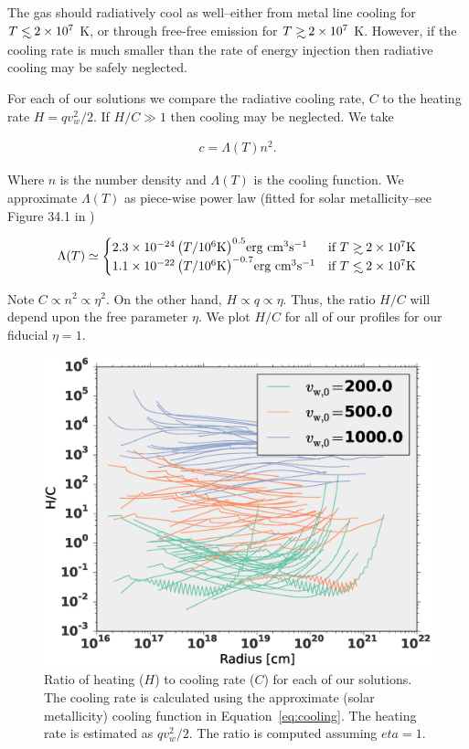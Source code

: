 \documentclass[usenatbib,fleqn]{mn2e}
\newcommand\lsim{\mathrel{\rlap{\lower4pt\hbox{\hskip1pt$\sim$}}
        \raise1pt\hbox{$<$}}}
\newcommand\gsim{\mathrel{\rlap{\lower4pt\hbox{\hskip1pt$\sim$}}
        \raise1pt\hbox{$>$}}}
\newcommand{\vw}{v_w}
\begin{document}
The gas should radiatively cool as well--either from metal line cooling for $T\lsim 2\times 10^7$ K, or through free-free emission for $T\gsim 2\times 10^7$ K.  However, if the cooling rate is much smaller than the rate of energy injection then radiative cooling may be safely neglected.  

For each of our solutions we compare the radiative cooling rate, $C$ to the heating rate $H=q \vw^2/2$. If $H/C \gg  1$ then cooling may be neglected. We take

\begin{align}
c=\Lambda(T) n^2.
\end{align}

Where $n$ is the number density and $\Lambda(T)$ is the cooling function. We approximate $\Lambda(T)$ as piece-wise power law (fitted for solar metallicity--see Figure 34.1 in \cite{Draine:2011a})

\[
\Lambda(T)\simeq
\begin{cases}
    2.3 \times 10^{-24} \left(T/10^6 \text{K}\right)^{0.5} $erg cm$^3 $s$^{-1}& \text{if } T \gsim 2 \times 10^7 \text{K} \\
    1.1 \times 10^{-22} \left(T/10^6 \text{K}\right)^{-0.7}  $erg cm$^3 $s$^{-1}& \text{if } T \lsim 2 \times 10^7 \text{K}     
\end{cases}
\label{eq:cooling}
\]

Note $C\propto n^2\propto \eta^2$. On the other hand, $H \propto q  \propto \eta$. Thus, the ratio $H/C$ will depend upon the free parameter $\eta$. We plot $H/C$ for all of our profiles for our fiducial $\eta=1$. 

\begin{figure}
\includegraphics[width=\columnwidth]{cooling.eps}
\caption{\label{fig:cooling} Ratio of heating ($H$) to cooling rate ($C$) for each of our solutions. The cooling rate is calculated using the approximate (solar metallicity) cooling function in Equation~\ref{eq:cooling}. The heating rate is estimated as $q \vw^2/2$. The ratio is computed assuming $eta=1$.}
\end{figure}
\end{document}

